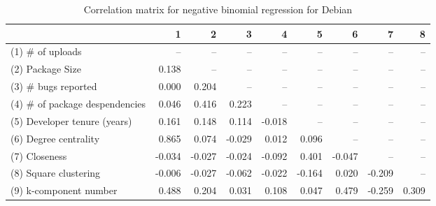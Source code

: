 \begin{table}[H]
\caption{Correlation matrix for negative binomial regression for Debian}
\label{corr_table_nbinomial}
\begin{center}
\begin{tabular}{lrrrrrrrr}
\toprule
{} &      1 &      2 &      3 &      4 &      5 &      6 &      7 &     8 \\
\midrule
(1) \# of uploads               &    -- &    -- &    -- &    -- &    -- &    -- &    -- &   -- \\
(2) Package Size               &  0.138 &    -- &    -- &    -- &    -- &    -- &    -- &   -- \\
(3) \# bugs reported            &  0.000 &  0.204 &    -- &    -- &    -- &    -- &    -- &   -- \\
(4) \# of package despendencies &  0.046 &  0.416 &  0.223 &    -- &    -- &    -- &    -- &   -- \\
(5) Developer tenure (years)   &  0.161 &  0.148 &  0.114 & -0.018 &    -- &    -- &    -- &   -- \\
(6) Degree centrality          &  0.865 &  0.074 & -0.029 &  0.012 &  0.096 &    -- &    -- &   -- \\
(7) Closeness                  & -0.034 & -0.027 & -0.024 & -0.092 &  0.401 & -0.047 &    -- &   -- \\
(8) Square clustering          & -0.006 & -0.027 & -0.062 & -0.022 & -0.164 &  0.020 & -0.209 &   -- \\
(9) k-component number         &  0.488 &  0.204 &  0.031 &  0.108 &  0.047 &  0.479 & -0.259 & 0.309 \\
\bottomrule
\end{tabular}
\end{center} 
\end{table}
